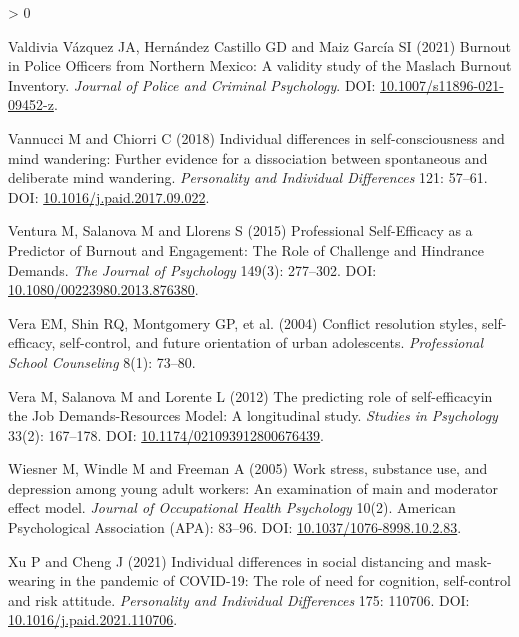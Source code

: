 \documentclass[
  english,
  man,floatsintext]{apa6}
\newlength{\cslhangindent}
\newenvironment{CSLReferences}[2] %
 {%
  \setlength{\parindent}{0pt}
  \ifodd #1 \everypar{\setlength{\hangindent}{\cslhangindent}}\ignorespaces\fi
  \ifnum #2 > 0
  \setlength{\parskip}{#2\baselineskip}
  \fi
 }%
 {}
\begin{document}
\begin{CSLReferences}{1}{0}
\leavevmode\hypertarget{ref-ValdiviaVazquez2021}{}%
Valdivia Vázquez JA, Hernández Castillo GD and Maiz García SI (2021) Burnout in {Police} {Officers} from {Northern} {Mexico}: {A} validity study of the {Maslach} {Burnout} {Inventory}. \emph{Journal of Police and Criminal Psychology}. DOI: \href{https://doi.org/10.1007/s11896-021-09452-z}{10.1007/s11896-021-09452-z}.

\leavevmode\hypertarget{ref-Vannucci2018}{}%
Vannucci M and Chiorri C (2018) Individual differences in self-consciousness and mind wandering: {Further} evidence for a dissociation between spontaneous and deliberate mind wandering. \emph{Personality and Individual Differences} 121: 57--61. DOI: \href{https://doi.org/10.1016/j.paid.2017.09.022}{10.1016/j.paid.2017.09.022}.

\leavevmode\hypertarget{ref-Ventura2015}{}%
Ventura M, Salanova M and Llorens S (2015) Professional {Self}-{Efficacy} as a {Predictor} of {Burnout} and {Engagement}: {The} {Role} of {Challenge} and {Hindrance} {Demands}. \emph{The Journal of Psychology} 149(3): 277--302. DOI: \href{https://doi.org/10.1080/00223980.2013.876380}{10.1080/00223980.2013.876380}.

\leavevmode\hypertarget{ref-Vera2004}{}%
Vera EM, Shin RQ, Montgomery GP, et al. (2004) Conflict resolution styles, self-efficacy, self-control, and future orientation of urban adolescents. \emph{Professional School Counseling} 8(1): 73--80.

\leavevmode\hypertarget{ref-Vera2012}{}%
Vera M, Salanova M and Lorente L (2012) The predicting role of self-efficacyin the {Job} {Demands}-{Resources} {Model}: {A} longitudinal study. \emph{Studies in Psychology} 33(2): 167--178. DOI: \href{https://doi.org/10.1174/021093912800676439}{10.1174/021093912800676439}.

\leavevmode\hypertarget{ref-Wiesner2005}{}%
Wiesner M, Windle M and Freeman A (2005) Work stress, substance use, and depression among young adult workers: An examination of main and moderator effect model. \emph{Journal of Occupational Health Psychology} 10(2). American Psychological Association ({APA}): 83--96. DOI: \href{https://doi.org/10.1037/1076-8998.10.2.83}{10.1037/1076-8998.10.2.83}.

\leavevmode\hypertarget{ref-Xu2021}{}%
Xu P and Cheng J (2021) Individual differences in social distancing and mask-wearing in the pandemic of {COVID}-19: {The} role of need for cognition, self-control and risk attitude. \emph{Personality and Individual Differences} 175: 110706. DOI: \href{https://doi.org/10.1016/j.paid.2021.110706}{10.1016/j.paid.2021.110706}.


\end{CSLReferences}
\end{document}
